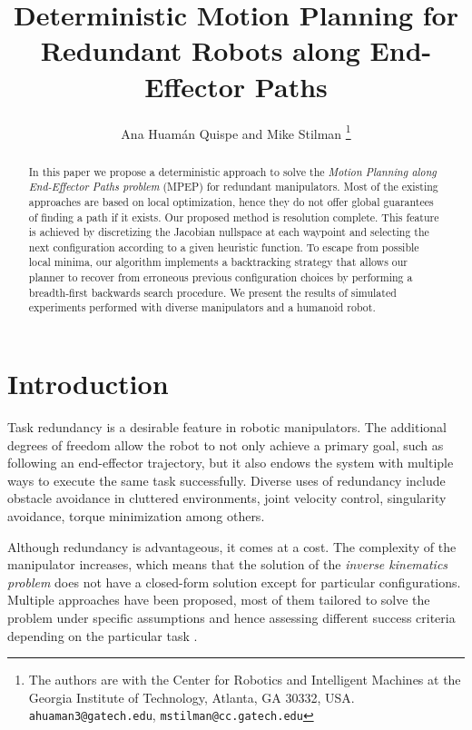 \documentclass[conference]{IEEEtran}
\begin{document}
\title{{D}eterministic {M}otion {P}lanning for {R}edundant {R}obots along {E}nd-{E}ffector {P}aths}
\author{Ana Huam\'an Quispe and Mike Stilman%
  \thanks{The authors are with the Center for Robotics and Intelligent
    Machines at the Georgia Institute of Technology, Atlanta, GA
    30332, USA. {\tt\small ahuaman3@gatech.edu}, {\tt\small mstilman@cc.gatech.edu}}}
\maketitle

\begin{abstract}
In this paper we propose a deterministic approach to solve the \emph{Motion Planning
along End-Effector Paths problem} (MPEP) for redundant manipulators. Most of the existing
approaches are based on local optimization, hence they do not
offer global guarantees of finding a path if it exists. Our proposed method is resolution complete.
This feature is achieved by discretizing the Jacobian nullspace at each waypoint and selecting the 
next configuration according to a given heuristic function. To escape from possible local minima, our
algorithm implements a backtracking strategy that allows our planner to recover from erroneous
previous configuration choices by performing a breadth-first backwards search procedure. We present the 
results of simulated experiments performed with diverse manipulators and a humanoid robot.  

\end{abstract}

\section{Introduction}
\cite{oriolo-ns-2002} Task redundancy is a desirable feature in robotic manipulators. The 
additional degrees of freedom allow the robot to not only achieve
a primary goal, such as following an end-effector trajectory, but 
it also endows the system with multiple ways to execute the same 
task successfully. Diverse uses of redundancy include obstacle 
avoidance in cluttered environments, joint velocity control,
singularity avoidance, torque minimization among others.

Although redundancy is advantageous, it comes at a
 cost. The complexity of the manipulator increases, which means
that the solution of the \emph{inverse kinematics problem} does not have
a closed-form solution except for particular configurations.
Multiple approaches have been proposed, most of them tailored to
solve the problem under specific assumptions and hence assessing different
success criteria depending on the particular task \cite{hooper-ns-1995}. 
\end{document}
